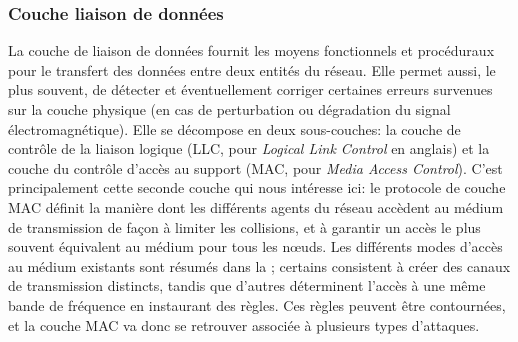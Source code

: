    \subsubsection{Couche liaison de données}
La couche de liaison de données fournit les moyens fonctionnels et procéduraux pour le transfert des données entre deux entités du réseau.
Elle permet aussi, le plus souvent, de détecter et éventuellement corriger certaines erreurs survenues sur la couche physique (en cas de perturbation ou dégradation du signal électromagnétique).
Elle se décompose en deux sous-couches: la couche de contrôle de la liaison logique (LLC, pour \textit{Logical Link Control} en anglais) et la couche du contrôle d'accès au support (MAC, pour \textit{Media Access Control}).
C'est principalement cette seconde couche qui nous intéresse ici: le protocole de couche MAC définit la manière dont les différents agents du réseau accèdent au médium de transmission de façon à limiter les collisions, et à garantir un accès le plus souvent équivalent au médium pour tous les nœuds.
Les différents modes d'accès au médium existants sont résumés dans la ; certains consistent à créer des canaux de transmission distincts, tandis que d'autres déterminent l'accès à une même bande de fréquence en instaurant des règles.
Ces règles peuvent être contournées, et la couche MAC va donc se retrouver associée à plusieurs types d'attaques.

